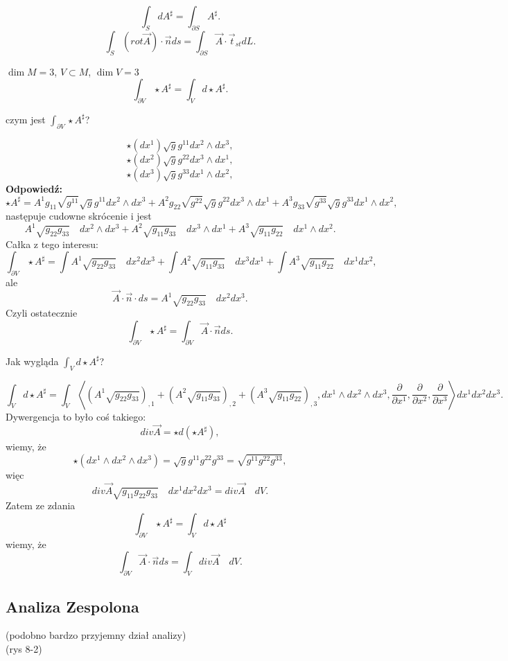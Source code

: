 \documentclass[../main.tex]{subfiles}
\begin{document}
\[
\int_S dA^\sharp = \int_{\partial S}A^\sharp
.\]
\[
    \int_S\left( rot \vec{A} \right) \cdot \vec{n} ds = \int_{\partial S}\vec{A} \cdot \vec{t}_{st}dL
.\]
\begin{przyklad}
    $\dim M = 3$, $V \subset M$, $\dim V = 3$
     \[
    \int_{\partial V}\star A^\sharp = \int_V d\star A^\sharp
    .\]
\end{przyklad}
\begin{pytanie}
czym jest $\int_{\partial V}\star A^\sharp$?
\end{pytanie}
\[
    \star(dx^{1})\sqrt{g}g^{11}  dx^{2}\land dx^{3}
,\]
\[
    \star(dx^{2})\sqrt{g}g^{22}  dx^{3}\land dx^{1}
,\]
\[
    \star(dx^{3})\sqrt{g}g^{33}  dx^{1}\land dx^{2}
,\]
\textbf{Odpowiedź:}
\[
\star A^\sharp = A^1g_{11}\sqrt{g^{11}} \sqrt{g} g^{11}dx^{2} \land dx^{3} + A^2 g_{22}\sqrt{g^{22}} \sqrt{g} g^{22} dx^{3} \land dx^{1} + A^3 g_{33}\sqrt{g^{33}} \sqrt{g} g^{33}dx^{1} \land dx^{2}
,\]
następuje cudowne skrócenie i jest
\[
A^1 \sqrt{g_{22}g_{33}}\quad dx^{2} \land dx^{3}  + A^2 \sqrt{g_{11}g_{33}} \quad dx^{3} \land dx^{1} + A^3 \sqrt{g_{11}g_{22}} \quad dx^{1} \land dx^{2}
.\]
Całka z tego interesu:
\[
\int_{\partial V}\star A^\sharp = \int A^1 \sqrt{g_{22}g_{33}}\quad dx^{2} dx^{3} + \int A^2 \sqrt{g_{11}g_{33}}\quad dx^{3} dx^{1} + \int A^3 \sqrt{g_{11}g_{22}} \quad dx^{1}  dx^{2}
,\]
ale
\[
    \vec{A}\cdot \vec{n}\cdot ds = A^1 \sqrt{g_{22}g_{33}}\quad dx^{2} dx^{3}
.\]
Czyli ostatecznie
\[
    \int_{\partial V}\star A^\sharp = \int_{\partial V}\vec{A}\cdot \vec{n}ds
.\]
\begin{pytanie}
Jak wygląda $\int_Vd\star A^\sharp$?
\end{pytanie}
\[
    \int_{V}d\star A^\sharp = \int_{V} \left< \left( A^1\sqrt{g_{22}g_{33}} \right)_{,1} + \left( A^2\sqrt{g_{11}g_{33}}  \right) _{,2} + \left( A^3\sqrt{g_{11}g_{22}}  \right) _{,3}, dx^{1} \land dx^{2} \land dx^{3} , \frac{\partial }{\partial x^1} , \frac{\partial }{\partial x^2} , \frac{\partial }{\partial x^3} \right> dx^{1} dx^{2} dx^{3}
.\]
Dywergencja to było coś takiego:
\[
    div \vec{A} = \star d\left( \star A^\sharp \right)
,\]
wiemy, że
\[
    \star\left( dx^{1} \land dx^{2} \land dx^{3}  \right) = \sqrt{g} g^{11}g^{22}g^{33} = \sqrt{g^{11}g^{22}g^{33}}
,\]
więc
\[
    div \vec{A} \sqrt{g_{11}g_{22}g_{33}}\quad dx^{1} dx^{2} dx^{3}= div\vec{A}\quad dV
.\]
Zatem ze zdania
\[
\int_{\partial V}\star A^\sharp = \int_V d\star A^\sharp
\]
wiemy, że
\[
    \int_{\partial V}\vec{A}\cdot \vec{n} ds = \int_V div \vec{A} \quad dV
.\]

\subsection{Analiza Zespolona}
(podobno bardzo przyjemny dział analizy)\\
(rys 8-2)
\end{document}
